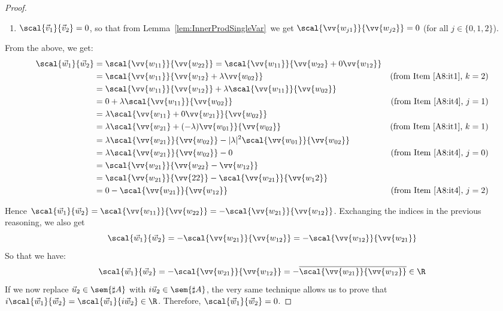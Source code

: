 \begin{proof}
\begin{enumerate}
        \item\label{A8:it4} $\scal{\vec{v}_{1}}{\vec{v}_{2}}=0$, so that from Lemma~\ref{lem:InnerProdSingleVar}~we get $\scal{\vv{w_{j1}}}{\vv{w_{j2}}}=0$ (for all $j\in\{0,1,2\}$).
    \end{enumerate}

    From the above, we get:
    \begin{align*}
        \scal{\vec{w}_{1}}{\vec{w}_{2}} &= \scal{\vv{w_{11}}}{\vv{w_{22}}} = \scal{\vv{w_{11}}}{\vv{w_{22}}+0\vv{w_{12}}} & \\
        &=\scal{\vv{w_{11}}}{\vv{w_{12}}+ \lambda\vv{w_{02}}} & (\text{from Item~\ref{A8:it1}, } k=2)\\
        &=\scal{\vv{w_{11}}}{\vv{w_{12}}} + \lambda \scal{\vv{w_{11}}}{\vv{w_{02}}} &\\
        &= 0 + \lambda \scal{\vv{w_{11}}}{\vv{w_{02}}} & (\text{from Item~\ref{A8:it4}, } j=1)\\
        &= \lambda \scal{\vv{w_{11}} + 0\vv{w_{21}}}{\vv{w_{02}}} & \\
        &= \lambda \scal{\vv{w_{21}} + (-\lambda)\vv{w_{01}}}{\vv{w_{02}}} & (\text{from Item~\ref{A8:it1}, } k=1)\\
        &= \lambda \scal{\vv{w_{21}}}{\vv{w_{02}}} - |\lambda|^2 \scal{\vv{w_{01}}}{\vv{w_{02}}} & \\
        &= \lambda \scal{\vv{w_{21}}}{\vv{w_{02}}} - 0 & (\text{from Item~\ref{A8:it4}, } j=0)\\
        &=\scal{\vv{w_{21}}}{\vv{w_{22}}- \vv{w_{12}}} & \\
        &=\scal{\vv{w_{21}}}{\vv{22}} - \scal{\vv{w_{21}}}{\vv{w_12}} & \\
        &= 0 - \scal{\vv{w_{21}}}{\vv{w_{12}}} & (\text{from Item~\ref{A8:it4}, } j=2)
    \end{align*}

    Hence $\scal{\vec{w}_{1}}{\vec{w}_{2}} = \scal{\vv{w_{11}}}{\vv{w_{22}}} = - \scal{\vv{w_{21}}}{\vv{w_{12}}}$. Exchanging the indices in the previous reasoning, we also get 
    \[
    \scal{\vec{w}_{1}}{\vec{w}_{2}}=-\scal{\vv{w_{21}}}{\vv{w_{12}}}=-\scal{\vv{w_{12}}}{\vv{w_{21}}}
    \]
    So that we have:
    \[
        \scal{\vec{w}_{1}}{\vec{w}_{2}}=-\scal{\vv{w_{21}}}{\vv{w_{12}}}=-\overline{\scal{\vv{w_{21}}}{\vv{w_{12}}}}\in\R
    \]
    If we now replace $\vec{u}_{2}\in\sem{\sharp A}$ with $i\vec{u}_{2}\in\sem{\sharp A}$, the very same technique allows us to prove that $i\scal{\vec{w}_{1}}{\vec{w}_{2}}=\scal{\vec{w}_{1}}{i \vec{w}_{2}}\in\R$. Therefore, $\scal{\vec{w}_{1}}{\vec{w}_{2}}=0$.
\end{proof}

